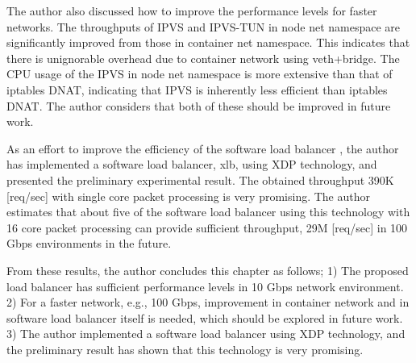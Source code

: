 The author also discussed how to improve the performance levels for faster networks.
The throughputs of IPVS and IPVS-TUN in node net namespace are significantly improved from those in container net namespace.
This indicates that there is unignorable overhead due to container network using veth+bridge.
The CPU usage of the IPVS in node net namespace is more extensive than that of iptables DNAT, indicating that IPVS is inherently less efficient than iptables DNAT.
The author considers that both of these should be improved in future work.



As an effort to improve the efficiency of the software load balancer , 
the author has implemented a  software load balancer, xlb, using XDP technology, and presented the preliminary experimental result.
The obtained throughput 390K [req/sec] with single core packet processing is very promising.
The author estimates that about five of the software load balancer using this technology with 16 core packet processing can provide sufficient throughput, 29M [req/sec] in 100 Gbps environments in the future. 


From these results, the author concludes this chapter as follows;
1) The proposed load balancer has sufficient performance levels in 10 Gbps network environment.
2) For a faster network, e.g., 100 Gbps, improvement in container network and in software load balancer itself is needed, which should be explored in future work.
3) The author implemented a software load balancer using XDP technology, and the preliminary result has shown that this technology is very promising.

